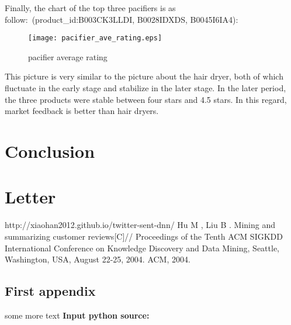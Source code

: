 \documentclass{mcmthesis}
\begin{document}
	Finally, the chart of the top three pacifiers is as follow:\ (product\_id:B003CK3LLDI, B0028IDXDS, B0045I6IA4):
	\begin{figure}[H]
		\small
		\centering
		\texttt{[image: pacifier\_ave\_rating.eps]}
		\caption{pacifier average rating} \label{fig:pacifier average rating}
	\end{figure}
	This picture is very similar to the picture about the hair dryer, both of which fluctuate in the early stage and stabilize in the later stage. In the later period, the three products were stable between four stars and 4.5 stars. In this regard, market feedback is better than hair dryers.
	
	
	
	
	\section{Conclusion}
	
	
	\section{Letter}
	
	
	\begin{thebibliography}{99}
		 http://xiaohan2012.github.io/twitter-sent-dnn/
		 Hu M , Liu B . Mining and summarizing customer reviews[C]// Proceedings of the Tenth ACM SIGKDD International Conference on Knowledge Discovery and Data Mining, Seattle, Washington, USA, August 22-25, 2004. ACM, 2004.
		
	\end{thebibliography}
	
	\begin{appendices}
		
		\section{First appendix}
		
		
		some more text \textcolor[rgb]{0.98,0.00,0.00}{\textbf{Input python source:}}
		
		
	\end{appendices}
\end{document}
